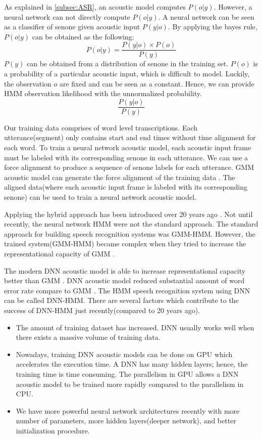 As explained in \ref{subsec:ASR}, an acoustic model computes $P(o|y)$. However, a neural network can not directly compute $P(o|y)$. A neural network can be seen as a classifier of senone given acoustic input $P(y|o)$. By applying the bayes rule, $P(o|y)$ can be obtained as the following:
\begin{equation}
P(o|y)  = \frac{P(y|o) \times P(o)}{P(y)}
\end{equation}
$P(y)$ can be obtained from a distribution of senone in the training set. $P(o)$ is a probability of a particular acoustic input, which is difficult to model. Luckily, the observation $o$ are fixed and can be seen as a constant. Hence, we can provide HMM observation likelihood with the unnormalized probability.
\begin{equation}
\frac{P(y|o) }{P(y)}
\end{equation}

Our training data comprises of word level transcriptions. Each utterance(segment) only contains start and end times without time alignment for each word. To train a neural network acoustic model, each acoustic input frame must be labeled with its corresponding senone in each utterance. We can use a force alignment to produce a sequence of senone labels for each utterance. GMM acoustic model can generate the force alignment of the training data \cite{1406.7806}. The aligned data(where each acoustic input frame is labeled with its corresponding senone) can be used to train a neural network acoustic model. 


Applying the hybrid approach has been introduced over 20 years ago \cite{Bourlard:1993:CSR:562393,Renals1994}. Not until recently, the neural network HMM were not the standard approach. The standard approach for building speech recognition systems was GMM-HMM. However, the trained system(GMM-HMM) became complex when they tried to increase the representational capacity of GMM \cite{1406.7806}. 

The modern DNN acoustic model is able to increase representational capacity better than GMM \cite{1406.7806}.  DNN acoustic model reduced substantial amount of word error rate compare to GMM \cite{Dahl2011,38130}. The HMM speech recognition system using DNN can be called DNN-HMM. There are several factors which contribute to the success of  DNN-HMM just recently(compared to 20 years ago).
\begin{itemize}
\item The amount of training dataset has increased. DNN usually works well when there exists a massive volume of training data.
\item Nowadays, training DNN acoustic models can be done on GPU which accelerates the execution time. A DNN has many hidden layers; hence, the training time is time consuming. The parallelism in GPU allows a DNN acoustic model to be trained more rapidly compared to the parallelism in CPU.
\item We have more powerful neural network architectures recently with more number of parameters, more hidden layers(deeper network), and better initialization procedure. 
\end{itemize}

